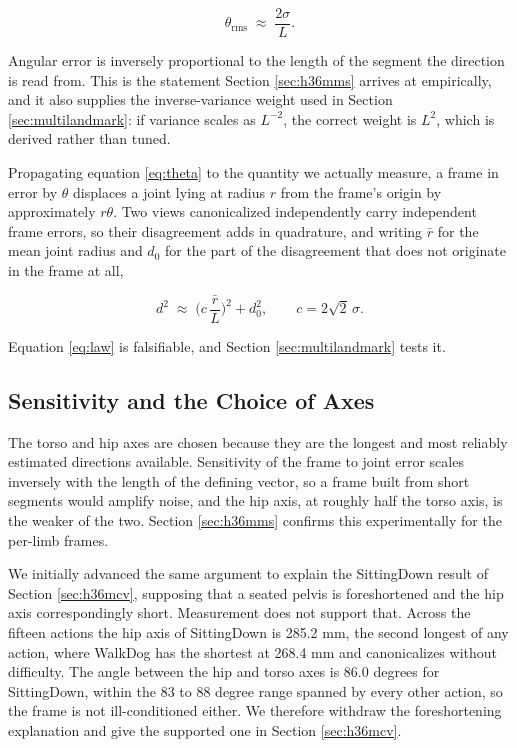 \documentclass[12pt,a4paper]{report}
\begin{document}
\begin{equation}
\theta_{\mathrm{rms}} \;\approx\; \frac{2\sigma}{L} .
\label{eq:theta}
\end{equation}

Angular error is inversely proportional to the length of the segment the direction is read from. This is the statement Section \ref{sec:h36mms} arrives at empirically, and it also supplies the inverse-variance weight used in Section \ref{sec:multilandmark}: if variance scales as $L^{-2}$, the correct weight is $L^{2}$, which is derived rather than tuned.

Propagating equation \eqref{eq:theta} to the quantity we actually measure, a frame in error by $\theta$ displaces a joint lying at radius $r$ from the frame's origin by approximately $r\theta$. Two views canonicalized independently carry independent frame errors, so their disagreement adds in quadrature, and writing $\bar{r}$ for the mean joint radius and $d_0$ for the part of the disagreement that does not originate in the frame at all,

\begin{equation}
d^{2} \;\approx\; \Big(c\,\frac{\bar{r}}{L}\Big)^{2} + d_0^{2},
\qquad c = 2\sqrt{2}\,\sigma .
\label{eq:law}
\end{equation}

Equation \eqref{eq:law} is falsifiable, and Section \ref{sec:multilandmark} tests it.

\subsection{Sensitivity and the Choice of Axes}

The torso and hip axes are chosen because they are the longest and most reliably estimated directions available. Sensitivity of the frame to joint error scales inversely with the length of the defining vector, so a frame built from short segments would amplify noise, and the hip axis, at roughly half the torso axis, is the weaker of the two. Section \ref{sec:h36mms} confirms this experimentally for the per-limb frames.

We initially advanced the same argument to explain the SittingDown result of Section \ref{sec:h36mcv}, supposing that a seated pelvis is foreshortened and the hip axis correspondingly short. Measurement does not support that. Across the fifteen actions the hip axis of SittingDown is 285.2 mm, the second longest of any action, where WalkDog has the shortest at 268.4 mm and canonicalizes without difficulty. The angle between the hip and torso axes is 86.0 degrees for SittingDown, within the 83 to 88 degree range spanned by every other action, so the frame is not ill-conditioned either. We therefore withdraw the foreshortening explanation and give the supported one in Section \ref{sec:h36mcv}.
\end{document}
